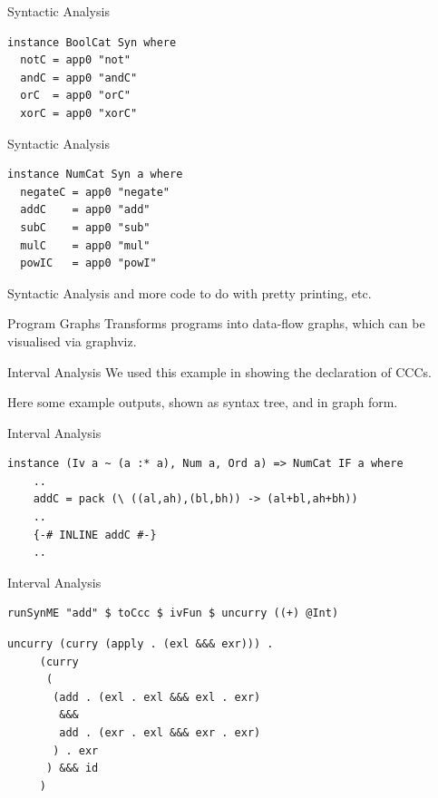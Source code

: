 \documentclass[10pt]{beamer}
\theoremstyle{definition}
\theoremstyle{remark}
\numberwithin{equation}{section}
\begin{document}
\begin{frame}[fragile]{Syntactic Analysis}
  \begin{lstlisting}
instance BoolCat Syn where
  notC = app0 "not"
  andC = app0 "andC"
  orC  = app0 "orC"
  xorC = app0 "xorC"
  \end{lstlisting}
\end{frame}

\begin{frame}[fragile]{Syntactic Analysis}
  \begin{lstlisting}
instance NumCat Syn a where
  negateC = app0 "negate"
  addC    = app0 "add"
  subC    = app0 "sub"
  mulC    = app0 "mul"
  powIC   = app0 "powI"
  \end{lstlisting}
\end{frame}

\begin{frame}[fragile]{Syntactic Analysis}
  and more code to do with pretty printing, etc.
\end{frame}

\begin{frame}[fragile]{Program Graphs}
  Transforms programs into data-flow graphs, which can be visualised via graphviz.
\end{frame}


\begin{frame}[fragile]{Interval Analysis}
  We used this example in showing the declaration of CCCs.

  Here some example outputs, shown as syntax tree, and in graph form.
\end{frame}

\begin{frame}[fragile]{Interval Analysis}
  \begin{lstlisting}[frame=single]
  instance (Iv a ~ (a :* a), Num a, Ord a) => NumCat IF a where
    ..
    addC = pack (\ ((al,ah),(bl,bh)) -> (al+bl,ah+bh))
    ..
    {-# INLINE addC #-}
    ..
  \end{lstlisting}
\end{frame}

\begin{frame}[fragile]{Interval Analysis}
  \begin{lstlisting}[frame=single]
    runSynME "add" $ toCcc $ ivFun $ uncurry ((+) @Int)
  \end{lstlisting}
  \begin{lstlisting}[frame=single]
     uncurry (curry (apply . (exl &&& exr))) .
     (curry
      (
       (add . (exl . exl &&& exl . exr)
        &&&
        add . (exr . exl &&& exr . exr)
       ) . exr
      ) &&& id
     )
  \end{lstlisting}
\end{frame}
\end{document}
